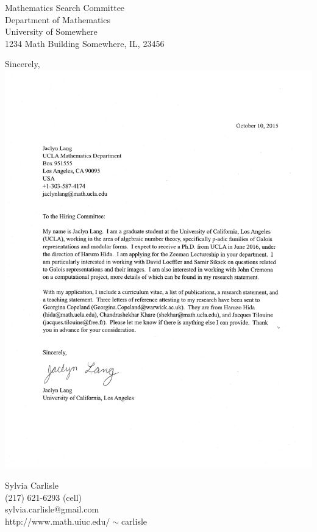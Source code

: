 \documentclass{letter}
\begin{document}
\begin{letter}{Mathematics Search Committee\\
Department of Mathematics\\
University of Somewhere\\
1234 Math Building
Somewhere, IL, 23456}
\closing{Sincerely,
\includegraphics{signature.pdf}
}

Sylvia Carlisle\\
(217) 621-6293 (cell)\\sylvia.carlisle@gmail.com\\
http://www.math.uiuc.edu$/\sim$carlisle
\end{letter}
\end{document}
